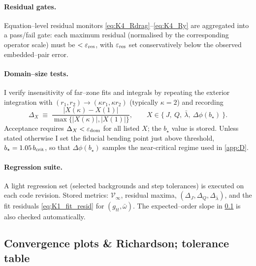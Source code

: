 \documentclass{iopjournal}
\begin{document}
\paragraph{Residual gates.}
Equation–level residual monitors \eqref{eq:K4_Rdrag}–\eqref{eq:K4_Ry} are aggregated into a pass/fail gate: each maximum residual (normalised by the corresponding operator scale) must be $<\varepsilon_{\rm res}$, with $\varepsilon_{\rm res}$ set conservatively below the observed embedded–pair error.

\paragraph{Domain–size tests.}
I verify insensitivity of far–zone fits and integrals by repeating the exterior integration with $(r_1,r_2)\to(\kappa r_1,\kappa r_2)$ (typically $\kappa=2$) and recording
\[
\Delta_X\;\equiv\;\frac{|X(\kappa)-X(1)|}{\max\{|X(\kappa)|,|X(1)|\}},
\qquad X\in\{\ J,\ Q,\ \bar\lambda,\ \Delta\phi(b_\star)\ \}.
\]
Acceptance requires $\Delta_X<\varepsilon_{\rm dom}$ for all listed $X$; the $b_\star$ value is stored. Unless stated otherwise I set the fiducial bending point just above threshold, $b_\star=1.05\,b_{\rm crit}$, so that $\Delta\phi(b_\star)$ samples the near-critical regime used in \cref{app:D}.


\paragraph{Regression suite.}
A light regression set (selected backgrounds and step tolerances) is executed on each code revision. Stored metrics: $\mathcal V_{\infty}$, residual maxima, $(\Delta_J,\Delta_Q,\Delta_{\bar\lambda})$, and the fit residuals \eqref{eq:K1_fit_resid} for $(g_{tt},\bar\omega)$. The expected–order slope in \cref{app:K6} is also checked automatically.

\subsection{Convergence plots \& Richardson; tolerance table}\label{app:K6}
\end{document}
